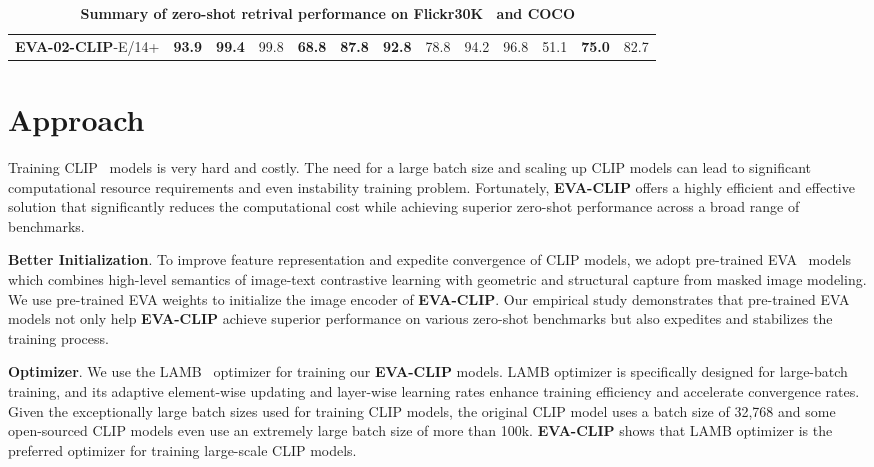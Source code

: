 \documentclass[10pt,twocolumn,letterpaper]{article}
\newcommand{\evablue}[1]{\textcolor{00blue!80}{#1}}
\renewcommand{\paragraph}[1]{\vspace{1.25mm}\noindent\textbf{#1}}
\newcommand{\evaclip}{{\textbf{\evablue{EVA-CLIP}}}\xspace}
\newcommand{\evaTwoclip}{{\textbf{\evablue{EVA-02-CLIP}}}\xspace}
\newcommand{\rgray}{\rowcolor{Graylight!30}}
\begin{document}
\begin{table*}[h]
\begin{tabular}{r|ccc|ccc|ccc|ccc}
        \rgray
        \scriptsize \evaTwoclip-E/14+ & \scriptsize \textbf{93.9} & \scriptsize \textbf{99.4} & \scriptsize 99.8 & \scriptsize \textbf{68.8} & \scriptsize \textbf{87.8} & \scriptsize \textbf{92.8} & \scriptsize 78.8 & \scriptsize 94.2 & \scriptsize 96.8 & \scriptsize 51.1 & \scriptsize \textbf{75.0} & \scriptsize 82.7 \\
    \end{tabular}
\vspace{-1.em}
\caption{\textbf{Summary of zero-shot retrival performance on Flickr30K~\cite{flickr30K} and COCO~\cite{lin2014coco}}}
\label{tab: clip zs retrieval}
\end{table*}

\section{Approach}

Training CLIP~\cite{clip} models is very hard and costly. The need for a large batch size and scaling up CLIP models can lead to significant computational resource requirements and even instability training problem. Fortunately, \evaclip offers a highly efficient and effective solution that significantly reduces the computational cost while achieving superior zero-shot performance across a broad range of benchmarks.

\paragraph{Better Initialization}. To improve feature representation and expedite convergence of CLIP models, we adopt pre-trained EVA~\cite{eva, EVA02} models which combines high-level semantics of image-text contrastive learning with geometric and structural capture from masked image modeling. We use pre-trained EVA weights to initialize the image encoder of \evaclip. Our empirical study demonstrates that pre-trained EVA models not only help \evaclip achieve superior performance on various zero-shot benchmarks but also expedites and stabilizes the training process.

\paragraph{Optimizer}. We use the LAMB~\cite{lamb} optimizer for training our \evaclip models. LAMB optimizer is specifically designed for large-batch training, and its adaptive element-wise updating and layer-wise learning rates enhance training efficiency and accelerate convergence rates. Given the exceptionally large batch sizes used for training CLIP models, the original CLIP model uses a batch size of 32,768 and some open-sourced CLIP models even use an extremely large batch size of more than 100k. \evaclip shows that LAMB optimizer is the preferred optimizer for training large-scale CLIP models.
\end{document}
